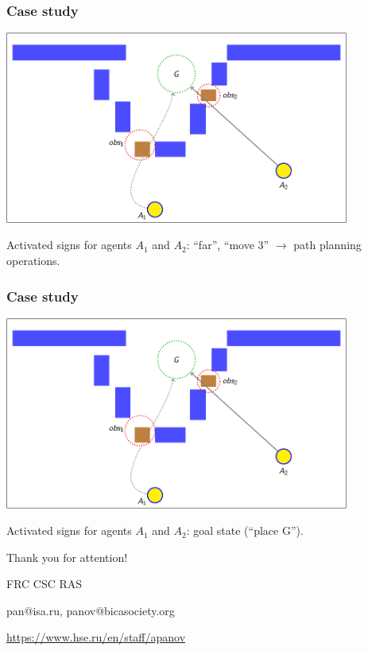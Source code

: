 \documentclass[default]{beamer}
\begin{document}
	\begin{frame}
		\frametitle{Case study}
		
		\begin{center}
			\includegraphics[page=116,width=0.85\textwidth]{examples/slides_colored}
		\end{center}
		\par\bigskip
		Activated signs for agents $A_1$ and $A_2$: ``far'', ``move 3'' $\rightarrow$ \color{red} path planning operations.
	\end{frame}
	
	\begin{frame}
		\frametitle{Case study}
		
		\begin{center}
			\includegraphics[page=171,width=0.85\textwidth]{examples/slides_colored}
		\end{center}
		\par\bigskip
		Activated signs for agents $A_1$ and $A_2$: goal state (``place G'').
	\end{frame}
		
	\begin{frame}
		\centering
		\Huge
		Thank you for attention!
		\normalsize
		\par\bigskip
		\par\bigskip
		FRC CSC RAS
		\par\bigskip
		pan@isa.ru, panov@bicasociety.org
		\par\bigskip
		\url{https://www.hse.ru/en/staff/apanov}
	\end{frame}
														
\end{document}
